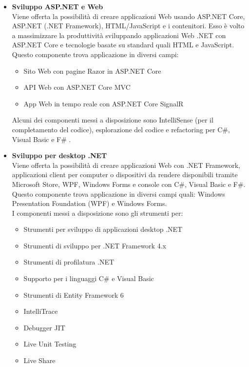 \begin{itemize}
\item
\textbf{Sviluppo ASP.NET e Web}\\
Viene offerta la possibilità di creare applicazioni Web usando ASP.NET Core, ASP.NET (.NET Framework), HTML/JavaScript e i contenitori. Esso è volto a massimizzare la produttività sviluppando applicazioni Web .NET con ASP.NET Core e tecnologie basate su standard quali HTML e JavaScript.
Questo componente trova applicazione in diversi campi:
\begin{itemize}
\item 
Sito Web con pagine Razor in ASP.NET Core
\item 
API Web con ASP.NET Core MVC
\item 
App Web in tempo reale con ASP.NET Core SignalR
\end{itemize}
Alcuni dei componenti messi a disposizione sono IntelliSense (per il completamento del codice), esplorazione del codice e refactoring per C\#, Visual Basic e F\# \cite{VS}.

\item
\textbf{Sviluppo per desktop .NET}\\
Viene offerta la possibilità di creare applicazioni Web con .NET Framework, applicazioni client per computer o dispositivi da rendere disponibili tramite Microsoft Store, WPF, Windows Forms e console con C\#, Visual Basic e F\#. Questo componente trova applicazione in diversi campi quali: Windows Presentation Foundation (WPF) e Windows Forms.\\
I componenti messi a disposizione sono gli strumenti per:
\begin{itemize}
\item
Strumenti per sviluppo di applicazioni desktop .NET
\item
Strumenti di sviluppo per .NET Framework 4.x
\item
Strumenti di profilatura .NET
\item
Supporto per i linguaggi C\# e Visual Basic
\item
Strumenti di Entity Framework 6
\item
IntelliTrace
\item
Debugger JIT
\item
Live Unit Testing
\item
Live Share
\end{itemize}
\end{itemize}

